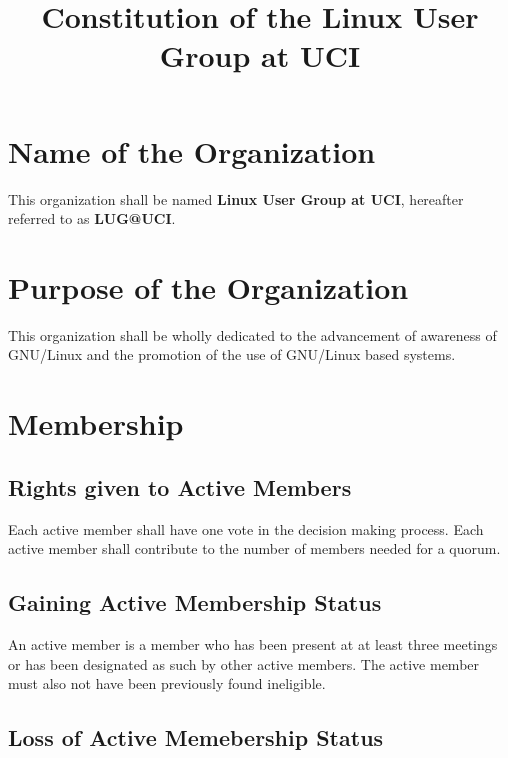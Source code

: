 \documentclass{article}
\title{Constitution of the Linux User Group at UCI}
\begin{document}
\maketitle

\section{Name of the Organization}

This organization shall be named \textbf{Linux User Group at UCI}, hereafter 
referred to as \textbf{LUG@UCI}.

\section{Purpose of the Organization}

This organization shall be wholly dedicated to the advancement of awareness of 
GNU/Linux and the promotion of the use of GNU/Linux based systems.

\section{Membership}




\subsection{Rights given to Active Members}

Each active member shall have one vote in the decision making process.
Each active member shall contribute to the number of members needed for a quorum.

\subsection{Gaining Active Membership Status}

An active member is a member who has been present at at least three meetings or
has been designated as such by other active members. The active member must also
not have been previously found ineligible.

\subsection{Loss of Active Memebership Status}
\end{document}
